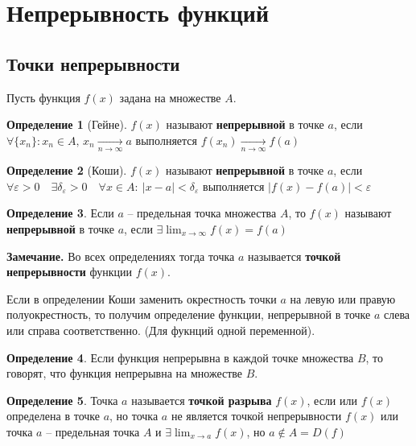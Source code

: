 \documentclass[a4paper,oneside]{article}
\newcommand{\dslim}{\displaystyle\lim}
\newcommand{\eps}{\varepsilon}
\newcommand{\approach}[1]{\underset{#1}{\longrightarrow}}
\theoremstyle{definition}
\newtheorem{definition}{Определение}[subsection]
\theoremstyle{definition}
\theoremstyle{definition}
\begin{document}
\section{Непрерывность функций}

\subsection{Точки непрерывности}

Пусть функция $f(x)$ задана на множестве $A$.

\begin{definition}[Гейне]
    $f(x)$ называют \textbf{непрерывной} в точке $a$, если
    $\forall \{ x_n \}: x_n \in A,\, x_n \approach{n \to \infty} a$
    выполняется $f(x_n) \approach{n \to \infty} f(a)$
\end{definition}

\begin{definition}[Коши]
    $f(x)$ называют \textbf{непрерывной} в точке $a$, если
    $\forall \eps > 0 \quad \exists \delta_\eps > 0 \quad
    \forall x \in A: \: |x - a| < \delta_\eps$ выполняется
    $|f(x) - f(a)| < \eps$
\end{definition}

\begin{definition}
    Если $a$ -- предельная точка множества $A$, то $f(x)$ называют \textbf{непрерывной}
    в точке $a$, если $\exists \dslim_{x \to \infty} f(x) = f(a)$
\end{definition}

\textbf{Замечание.} Во всех определениях тогда точка $a$ называется \textbf{точкой непрерывности}
функции $f(x)$.

Если в определении Коши заменить окрестность точки $a$ на левую или правую полуокрестность,
то получим определение функции, непрерывной в точке $a$ слева или справа соответственно.
(Для фукнций одной переменной).

\begin{definition}
    Если функция непрерывна в каждой точке множества $B$, 
    то говорят, что функция непрерывна на множестве $B$.
\end{definition}

\begin{definition}
    Точка $a$ называется \textbf{точкой разрыва} $f(x)$, если или $f(x)$ определена
    в точке $a$, но точка $a$ не является точкой непрерывности $f(x)$ или точка $a$ --
    предельная точка $A$ и $\exists \dslim_{x \to a} f(x)$, но $a \notin A = D(f)$
\end{definition}
\end{document}
